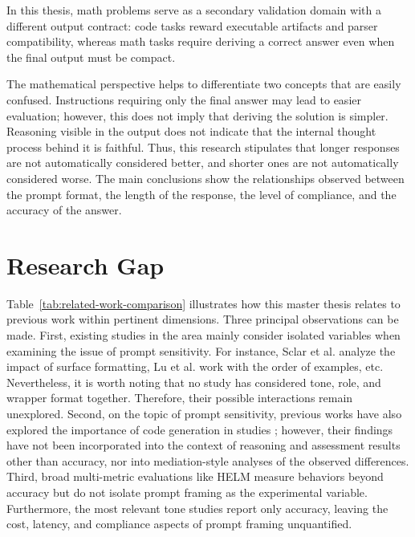 In this thesis, math problems serve as a secondary validation domain with a different output contract: code tasks reward executable artifacts and parser compatibility, whereas math tasks require deriving a correct answer even when the final output must be compact.

The mathematical perspective helps to differentiate two concepts that are easily confused. Instructions requiring only the final answer may lead to easier evaluation; however, this does not imply that deriving the solution is simpler. Reasoning visible in the output does not indicate that the internal thought process behind it is faithful. Thus, this research stipulates that longer responses are not automatically considered better, and shorter ones are not automatically considered worse. The main conclusions show the relationships observed between the prompt format, the length of the response, the level of compliance, and the accuracy of the answer.

\section{Research Gap\label{sec:research-gap}}

Table~\ref{tab:related-work-comparison} illustrates how this master thesis relates to previous work within pertinent dimensions. Three principal observations can be made. First, existing studies in the area mainly consider isolated variables when examining the issue of prompt sensitivity. For instance, Sclar et al. \cite{sclar2023spurious} analyze the impact of surface formatting, Lu et al. \cite{lu2021fantastically} work with the order of examples, etc. Nevertheless, it is worth noting that no study has considered tone, role, and wrapper format together. Therefore, their possible interactions remain unexplored. Second, on the topic of prompt sensitivity, previous works have also explored the importance of code generation in studies \cite{zhuo2024prosa}; however, their findings have not been incorporated into the context of reasoning and assessment results other than accuracy, nor into mediation-style analyses of the observed differences. Third, broad multi-metric evaluations like HELM \cite{liang2023helm} measure behaviors beyond accuracy but do not isolate prompt framing as the experimental variable. Furthermore, the most relevant tone studies report only accuracy, leaving the cost, latency, and compliance aspects of prompt framing unquantified.

